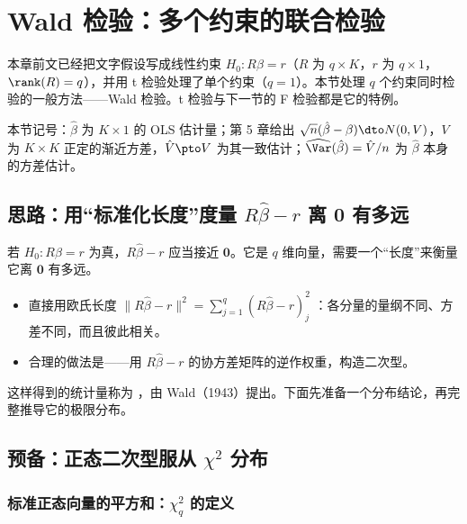 \section{Wald 检验：多个约束的联合检验}\label{sec:U06b-wald}

本章前文已经把文字假设写成线性约束 $H_0:R\beta=r$（$R$ 为 $q\times K$，$r$ 为 $q\times1$，$\rank(R)=q$），并用 t 检验处理了单个约束（$q=1$）。本节处理 $q$ 个约束同时检验的一般方法——Wald 检验。t 检验与下一节的 F 检验都是它的特例。

本节记号：$\hat\beta$ 为 $K\times1$ 的 OLS 估计量；第 5 章给出 $\sqrt n(\hat\beta-\beta)\dto N(0,V)$，$V$ 为 $K\times K$ 正定的渐近方差，$\hat V\pto V$ 为其一致估计；$\widehat{\Var}(\hat\beta)=\hat V/n$ 为 $\hat\beta$ 本身的方差估计。

\subsection{思路：用“标准化长度”度量 \texorpdfstring{$R\hat\beta-r$}{R beta-hat - r} 离 0 有多远}

若 $H_0:R\beta=r$ 为真，$R\hat\beta-r$ 应当接近 $\mathbf 0$。它是 $q$ 维向量，需要一个“长度”来衡量它离 $\mathbf 0$ 有多远。

\begin{itemize}
  \item 直接用欧氏长度 $\|R\hat\beta-r\|^2=\sum_{j=1}^q (R\hat\beta-r)_j^2$ ：各分量的量纲不同、方差不同，而且彼此相关。
  \item 合理的做法是——用 $R\hat\beta-r$ 的协方差矩阵的逆作权重，构造二次型。
\end{itemize}
这样得到的统计量称为 ，由 Wald（1943）提出。下面先准备一个分布结论，再完整推导它的极限分布。

\subsection{预备：正态二次型服从 \texorpdfstring{$\chi^2$}{chi-square} 分布}

\subsubsection{标准正态向量的平方和：\texorpdfstring{$\chi^2_q$}{chi-square q} 的定义}

